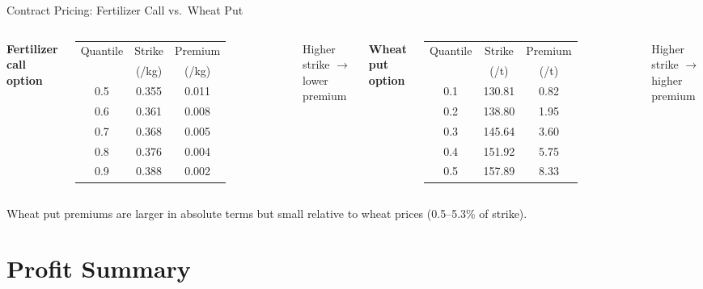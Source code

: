 \documentclass[aspectratio=169,12pt]{beamer}
\newcommand{\eur}{\texteuro}
\begin{document}
\begin{frame}{Contract Pricing: Fertilizer Call vs.\ Wheat Put}
\begin{columns}[T]
\textbf{Fertilizer call option}
\begin{table}
\centering
\small
\begin{tabular}{ccc}
\toprule
Quantile & Strike & Premium \\
 & (\eur/kg) & (\eur/kg) \\
\midrule
0.5 & 0.355 & 0.011 \\
0.6 & 0.361 & 0.008 \\
0.7 & 0.368 & 0.005 \\
0.8 & 0.376 & 0.004 \\
0.9 & 0.388 & 0.002 \\
\bottomrule
\end{tabular}
\end{table}
Higher strike $\rightarrow$ lower premium

\textbf{Wheat put option}
\begin{table}
\centering
\small
\begin{tabular}{ccc}
\toprule
Quantile & Strike & Premium \\
 & (\eur/t) & (\eur/t) \\
\midrule
0.1 & 130.81 & 0.82 \\
0.2 & 138.80 & 1.95 \\
0.3 & 145.64 & 3.60 \\
0.4 & 151.92 & 5.75 \\
0.5 & 157.89 & 8.33 \\
\bottomrule
\end{tabular}
\end{table}
Higher strike $\rightarrow$ higher premium
\end{columns}

\vspace{0.5em}
\small Wheat put premiums are larger in absolute terms but small relative to wheat prices (0.5--5.3\% of strike).
\end{frame}

\section{Profit Summary}
\end{document}
